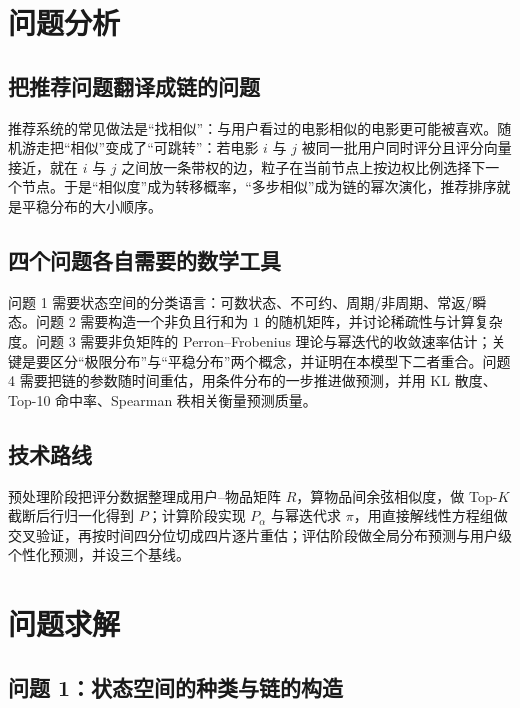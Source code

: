 \documentclass[12pt,a4paper]{ctexart}
\begin{document}
\section{问题分析}

\subsection{把推荐问题翻译成链的问题}

推荐系统的常见做法是“找相似”：与用户看过的电影相似的电影更可能被喜欢。随机游走把“相似”变成了“可跳转”：若电影 $i$ 与 $j$ 被同一批用户同时评分且评分向量接近，就在 $i$ 与 $j$ 之间放一条带权的边，粒子在当前节点上按边权比例选择下一个节点。于是“相似度”成为转移概率，“多步相似”成为链的幂次演化，推荐排序就是平稳分布的大小顺序。

\subsection{四个问题各自需要的数学工具}

问题 1 需要状态空间的分类语言：可数状态、不可约、周期/非周期、常返/瞬态。问题 2 需要构造一个非负且行和为 $1$ 的随机矩阵，并讨论稀疏性与计算复杂度。问题 3 需要非负矩阵的 Perron--Frobenius 理论与幂迭代的收敛速率估计；关键是要区分“极限分布”与“平稳分布”两个概念，并证明在本模型下二者重合。问题 4 需要把链的参数随时间重估，用条件分布的一步推进做预测，并用 KL 散度、Top-10 命中率、Spearman 秩相关衡量预测质量。

\subsection{技术路线}

预处理阶段把评分数据整理成用户--物品矩阵 $R$，算物品间余弦相似度，做 Top-$K$ 截断后行归一化得到 $P$；计算阶段实现 $P_{\alpha}$ 与幂迭代求 $\pi$，用直接解线性方程组做交叉验证，再按时间四分位切成四片逐片重估；评估阶段做全局分布预测与用户级个性化预测，并设三个基线。

\section{问题求解}

\subsection{问题 1：状态空间的种类与链的构造}
\end{document}
